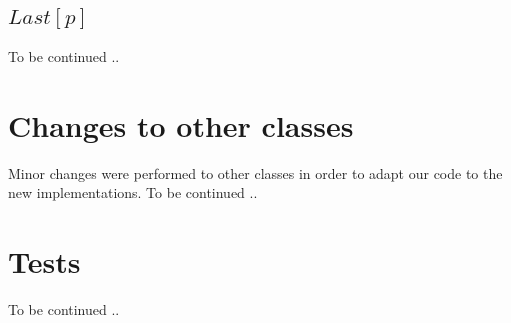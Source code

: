 \documentclass{article}
\begin{document}
\subsection{$Last[p]$}
To be continued ..

\section{Changes to other classes}
Minor changes were performed to other classes in order to adapt our code to the new implementations.
To be continued ..

\section{Tests}
To be continued ..



\end{document}
